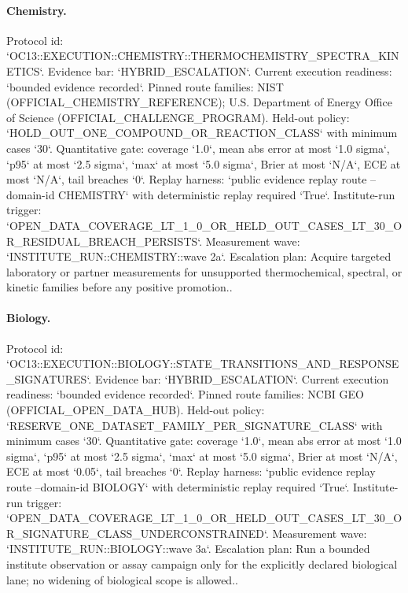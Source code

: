 \paragraph{Chemistry.}
Protocol id: `OC13::EXECUTION::CHEMISTRY::THERMOCHEMISTRY\_SPECTRA\_KINETICS`. Evidence bar: `HYBRID\_ESCALATION`. Current execution readiness: `bounded evidence recorded`.
Pinned route families: NIST (OFFICIAL\_CHEMISTRY\_REFERENCE); U.S. Department of Energy Office of Science (OFFICIAL\_CHALLENGE\_PROGRAM).
Held-out policy: `HOLD\_OUT\_ONE\_COMPOUND\_OR\_REACTION\_CLASS` with minimum cases `30`.
Quantitative gate: coverage `1.0`, mean abs error at most `1.0 sigma`, `p95` at most `2.5 sigma`, `max` at most `5.0 sigma`, Brier at most `N/A`, ECE at most `N/A`, tail breaches `0`.
Replay harness: `public evidence replay route --domain-id CHEMISTRY` with deterministic replay required `True`.
Institute-run trigger: `OPEN\_DATA\_COVERAGE\_LT\_1\_0\_OR\_HELD\_OUT\_CASES\_LT\_30\_OR\_RESIDUAL\_BREACH\_PERSISTS`. Measurement wave: `INSTITUTE\_RUN::CHEMISTRY::wave 2a`.
Escalation plan: Acquire targeted laboratory or partner measurements for unsupported thermochemical, spectral, or kinetic families before any positive promotion..

\paragraph{Biology.}
Protocol id: `OC13::EXECUTION::BIOLOGY::STATE\_TRANSITIONS\_AND\_RESPONSE\_SIGNATURES`. Evidence bar: `HYBRID\_ESCALATION`. Current execution readiness: `bounded evidence recorded`.
Pinned route families: NCBI GEO (OFFICIAL\_OPEN\_DATA\_HUB).
Held-out policy: `RESERVE\_ONE\_DATASET\_FAMILY\_PER\_SIGNATURE\_CLASS` with minimum cases `30`.
Quantitative gate: coverage `1.0`, mean abs error at most `1.0 sigma`, `p95` at most `2.5 sigma`, `max` at most `5.0 sigma`, Brier at most `N/A`, ECE at most `0.05`, tail breaches `0`.
Replay harness: `public evidence replay route --domain-id BIOLOGY` with deterministic replay required `True`.
Institute-run trigger: `OPEN\_DATA\_COVERAGE\_LT\_1\_0\_OR\_HELD\_OUT\_CASES\_LT\_30\_OR\_SIGNATURE\_CLASS\_UNDERCONSTRAINED`. Measurement wave: `INSTITUTE\_RUN::BIOLOGY::wave 3a`.
Escalation plan: Run a bounded institute observation or assay campaign only for the explicitly declared biological lane; no widening of biological scope is allowed..

